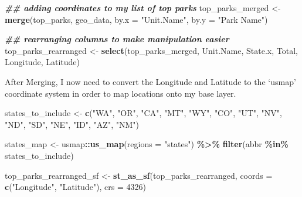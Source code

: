 \documentclass[
]{article}
\newenvironment{Shaded}{\begin{snugshade}}{\end{snugshade}}
\newcommand{\AttributeTok}[1]{\textcolor[rgb]{0.13,0.29,0.53}{#1}}
\newcommand{\DecValTok}[1]{\textcolor[rgb]{0.00,0.00,0.81}{#1}}
\newcommand{\DocumentationTok}[1]{\textcolor[rgb]{0.56,0.35,0.01}{\textbf{\textit{#1}}}}
\newcommand{\FunctionTok}[1]{\textcolor[rgb]{0.13,0.29,0.53}{\textbf{#1}}}
\newcommand{\NormalTok}[1]{#1}
\newcommand{\OtherTok}[1]{\textcolor[rgb]{0.56,0.35,0.01}{#1}}
\newcommand{\SpecialCharTok}[1]{\textcolor[rgb]{0.81,0.36,0.00}{\textbf{#1}}}
\newcommand{\StringTok}[1]{\textcolor[rgb]{0.31,0.60,0.02}{#1}}
\begin{document}
\begin{Shaded}
\begin{Highlighting}[]
 \DocumentationTok{\#\# adding coordinates to my list of top parks}
\NormalTok{top\_parks\_merged }\OtherTok{\textless{}{-}} \FunctionTok{merge}\NormalTok{(top\_parks, geo\_data, }
                     \AttributeTok{by.x =} \StringTok{"Unit.Name"}\NormalTok{, }\AttributeTok{by.y =} \StringTok{"Park Name"}\NormalTok{)}

  \DocumentationTok{\#\# rearranging columns to make manipulation easier}
\NormalTok{top\_parks\_rearranged }\OtherTok{\textless{}{-}} \FunctionTok{select}\NormalTok{(top\_parks\_merged, Unit.Name, State.x, Total, Longitude, Latitude)}
\end{Highlighting}
\end{Shaded}

After Merging, I now need to convert the Longitude and Latitude to the
`usmap' coordinate system in order to map locations onto my base layer.

\begin{Shaded}
\begin{Highlighting}[]
\NormalTok{states\_to\_include }\OtherTok{\textless{}{-}} \FunctionTok{c}\NormalTok{(}\StringTok{"WA"}\NormalTok{, }\StringTok{"OR"}\NormalTok{, }\StringTok{"CA"}\NormalTok{, }\StringTok{"MT"}\NormalTok{, }\StringTok{"WY"}\NormalTok{, }\StringTok{"CO"}\NormalTok{, }\StringTok{"UT"}\NormalTok{, }\StringTok{"NV"}\NormalTok{, }\StringTok{"ND"}\NormalTok{, }\StringTok{"SD"}\NormalTok{, }\StringTok{"NE"}\NormalTok{, }\StringTok{"ID"}\NormalTok{, }\StringTok{"AZ"}\NormalTok{, }\StringTok{"NM"}\NormalTok{)}

\NormalTok{states\_map }\OtherTok{\textless{}{-}}\NormalTok{ usmap}\SpecialCharTok{::}\FunctionTok{us\_map}\NormalTok{(}\AttributeTok{regions =} \StringTok{"states"}\NormalTok{) }\SpecialCharTok{\%\textgreater{}\%}
  \FunctionTok{filter}\NormalTok{(abbr }\SpecialCharTok{\%in\%}\NormalTok{ states\_to\_include)}

\NormalTok{top\_parks\_rearranged\_sf }\OtherTok{\textless{}{-}} \FunctionTok{st\_as\_sf}\NormalTok{(top\_parks\_rearranged, }
                                    \AttributeTok{coords =} \FunctionTok{c}\NormalTok{(}\StringTok{"Longitude"}\NormalTok{, }\StringTok{"Latitude"}\NormalTok{), }
                                    \AttributeTok{crs =} \DecValTok{4326}\NormalTok{)}
\end{Highlighting}
\end{Shaded}
\end{document}
